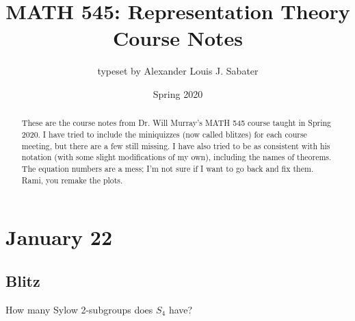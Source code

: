 \documentclass[12pt]{article}
\theoremstyle{definition}
\begin{document}
\date{Spring 2020} 
\author{typeset by Alexander Louis J. Sabater}
\title{MATH 545: Representation Theory Course Notes}
\maketitle
\newpage
\tableofcontents
\newpage
\begin{abstract}
    These are the course notes from Dr. Will Murray's MATH 545 course taught in Spring 2020. I have tried to include the miniquizzes (now called blitzes) for each course meeting, but there are a few still missing. I have also tried to be as consistent with his notation (with some slight modifications of my own), including the names of theorems. The equation numbers are a mess; I'm not sure if I want to go back and fix them. Rami, you remake the plots.
\end{abstract}
\section{January 22}
\subsection{Blitz}
How many Sylow 2-subgroups does $S_4$ have?
\end{document}
